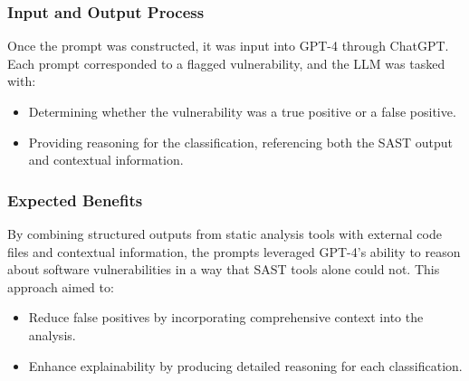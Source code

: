 \subsubsection{Input and Output Process}
Once the prompt was constructed, it was input into GPT-4 through ChatGPT. Each prompt corresponded to a flagged vulnerability, and the LLM was tasked with:
\begin{itemize}
    \item Determining whether the vulnerability was a true positive or a false positive.
    \item Providing reasoning for the classification, referencing both the SAST output and contextual information.
\end{itemize}

\subsubsection{Expected Benefits}
By combining structured outputs from static analysis tools with external code files and contextual information, the prompts leveraged GPT-4’s ability to reason about software vulnerabilities in a way that SAST tools alone could not. This approach aimed to:
\begin{itemize}
    \item Reduce false positives by incorporating comprehensive context into the analysis.
    \item Enhance explainability by producing detailed reasoning for each classification.
\end{itemize}

